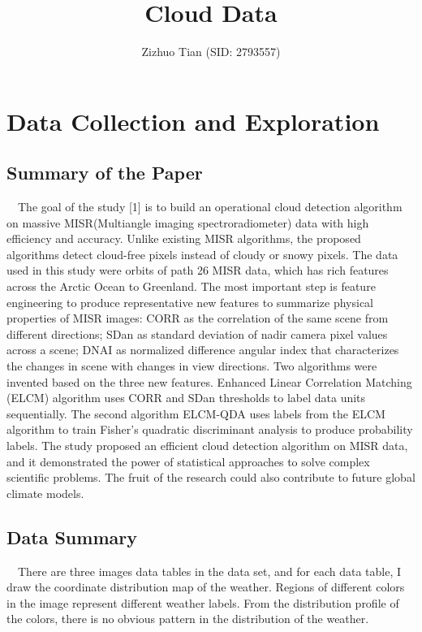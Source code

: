 \documentclass[11pt]{article}
\title{Cloud Data}
\author{
  Zizhuo Tian (SID: 2793557)
}
\begin{document}
\maketitle


\section{Data Collection and Exploration}
\subsection{Summary of the Paper} 

\quad\ \ The goal of the study [1] is to build an operational cloud detection algorithm on massive MISR(Multiangle imaging spectroradiometer) data with high efficiency and accuracy. Unlike existing MISR algorithms, the proposed algorithms detect cloud-free pixels instead of cloudy or snowy pixels. The data used in this study were orbits of path 26 MISR data, which has rich features across the Arctic Ocean to Greenland. The most important step is feature engineering to produce representative new features to summarize physical properties of MISR images: CORR as the correlation of the same scene from different directions; SDan as standard deviation of nadir camera pixel values across a scene; DNAI as normalized difference angular index that characterizes the changes in scene with changes in view directions. Two algorithms were invented based on the three new features. Enhanced Linear Correlation Matching (ELCM) algorithm uses CORR and SDan thresholds to label data units sequentially. The second algorithm ELCM-QDA uses labels from the ELCM algorithm to train Fisher's quadratic discriminant analysis to produce probability labels. The study proposed an efficient cloud detection algorithm on MISR data, and it demonstrated the power of statistical approaches to solve complex scientific problems. The fruit of the research could also contribute to future global climate models.


\subsection{Data Summary}

\quad\ \  There are three images data tables in the data set, and for each data table, I draw the coordinate distribution map of the weather. Regions of different colors in the image represent different weather labels. From the distribution profile of the colors, there is no obvious pattern in the distribution of the weather.
\end{document}
